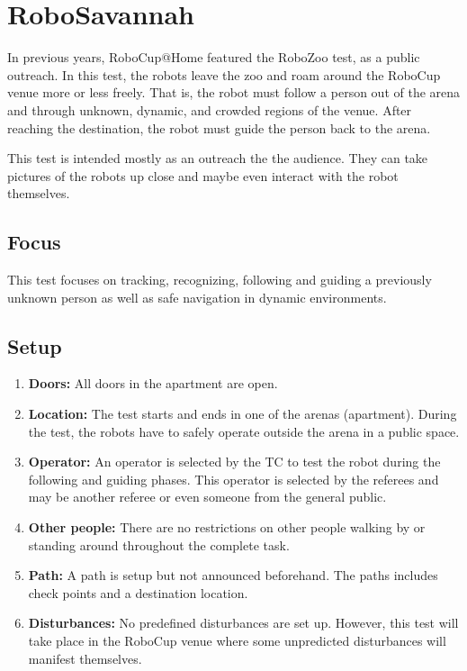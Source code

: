 \section{RoboSavannah}
In previous years, RoboCup@Home featured the RoboZoo test, as a public outreach. 
In this test, the robots leave the zoo and roam around the RoboCup venue more or less freely. 
That is, the robot must follow a person out of the arena and through unknown, dynamic, and crowded regions of the venue. 
After reaching the destination, the robot must guide the person back to the arena.

This test is intended mostly as an outreach the the audience. They can take pictures of the robots up close and maybe even interact with the robot themselves. 

\subsection{Focus}
This test focuses on tracking, recognizing, following and guiding a previously unknown person as well as safe navigation in dynamic environments.

\subsection{Setup}

\begin{enumerate}
\item \textbf{Doors:} All doors in the apartment are open.
\item \textbf{Location:} The test starts and ends in one of the arenas (apartment). During the test, the robots have to safely operate outside the arena in a public space.
\item \textbf{Operator:} An operator is selected by the TC to test the robot during the following and guiding phases.
  This operator is selected by the referees and may be another referee or even someone from the general public. 
\item \textbf{Other people:} There are no restrictions on other people walking by or standing around throughout the complete task.
\item \textbf{Path:} A path is setup but not announced beforehand. The paths includes check points and a destination location.
\item \textbf{Disturbances:} No predefined disturbances are set up. However, this test will take place in the RoboCup venue where some unpredicted disturbances will manifest themselves. 
\end{enumerate}

